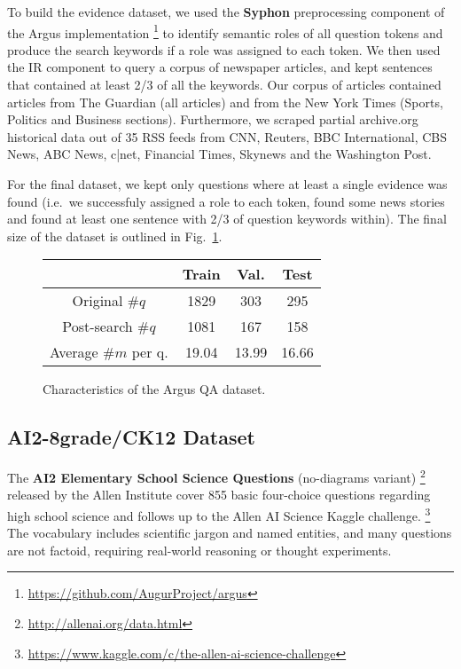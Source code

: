 \documentclass[11pt]{article}
\begin{document}
To build the evidence dataset, we used the \textbf{Syphon} preprocessing component
\cite{argus}
of the Argus implementation%
\footnote{\url{https://github.com/AugurProject/argus}}
to identify semantic roles of all question tokens and produce
the search keywords if a role was assigned to each token.
We then used the IR component to query a corpus of newspaper
articles, and kept sentences that contained at least 2/3 of all
the keywords.
Our corpus of articles contained articles from The Guardian (all articles) and from the New York Times (Sports, Politics and Business sections).  Furthermore, we scraped partial archive.org historical data out of 35 RSS feeds from CNN, Reuters, BBC International, CBS News, ABC News, c|net, Financial Times, Skynews and the Washington Post.

For the final dataset, we kept only questions where at least
a single evidence was found (i.e.\ we successfuly assigned a role
to each token, found some news stories and found at least one
sentence with 2/3 of question keywords within).  The final size
of the dataset is outlined in Fig.~\ref{tab:dataset}.

\begin{figure}
	\centering
	\begin{tabular}{|c|ccc|}
		\hline
		& Train & Val. & Test \\
		\hline
		Original $\#q$ & 1829 & 303 & 295 \\
		Post-search $\#q$ & 1081 & 167 & 158 \\
		Average $\#m$ per q. & 19.04 & 13.99 & 16.66 \\
		\hline
	\end{tabular}
	\vspace*{-0.2cm}
	\caption{\footnotesize%
		Characteristics of the Argus QA dataset.
	}
	\label{tab:dataset}
\end{figure}



\subsection{AI2-8grade/CK12 Dataset}

The \textbf{AI2 Elementary School Science Questions} (no-diagrams variant)%
\footnote{\url{http://allenai.org/data.html}} released by the Allen Institute
cover 855 basic four-choice questions regarding high school science
and follows up to the Allen AI Science Kaggle challenge.%
\footnote{\url{https://www.kaggle.com/c/the-allen-ai-science-challenge}}
The vocabulary includes scientific jargon and named entities, and many questions
are not factoid, requiring real-world reasoning or thought experiments.
\end{document}
